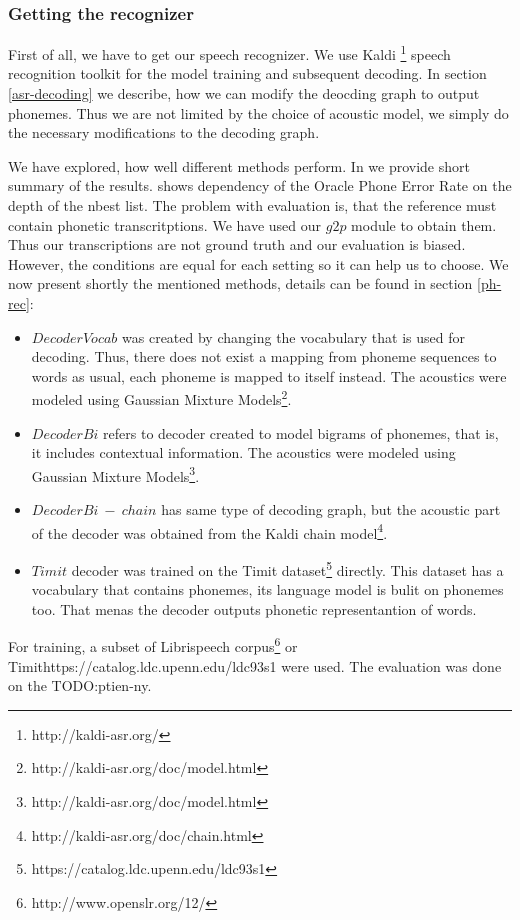 \subsubsection{Getting the recognizer}
First of all, we have to get our speech recognizer.
We use Kaldi \footnote{http://kaldi-asr.org/} speech recognition toolkit for the model training and subsequent decoding.
In section \ref{asr-decoding} we describe, how we can modify the deocding graph to output phonemes.
Thus we are not limited by the choice of acoustic model, we simply do the necessary modifications to the decoding graph.
\par
We have explored, how well different methods perform.
In  we provide short summary of the results.
 shows dependency of the Oracle Phone Error Rate on the depth of the nbest list.
The problem with evaluation is, that the reference must contain phonetic transcritptions.
We have used our $g2p$ module to obtain them.
Thus our transcriptions are not ground truth and our evaluation is biased.
However, the conditions are equal for each setting so it can help us to choose.
We now present shortly the mentioned methods, details can be found in section \ref{ph-rec}:
\begin{itemize}
\item $DecoderVocab$ was created by changing the vocabulary that is used for decoding. Thus, there does not exist a mapping from phoneme sequences to words as usual, each phoneme is mapped to itself instead. The acoustics were modeled using Gaussian Mixture Models\footnote{http://kaldi-asr.org/doc/model.html}.
\item $DecoderBi$ refers to decoder created to model bigrams of phonemes, that is, it includes contextual information. The acoustics were modeled using Gaussian Mixture Models\footnote{http://kaldi-asr.org/doc/model.html}.
\item $DecoderBi\:-\:chain$ has same type of decoding graph, but the acoustic part of the decoder was obtained from the Kaldi chain model\footnote{http://kaldi-asr.org/doc/chain.html}.
\item $Timit$ decoder was trained on the Timit dataset\footnote{https://catalog.ldc.upenn.edu/ldc93s1} directly. This dataset has a vocabulary that contains phonemes, its language model is bulit on phonemes too.
That menas the decoder outputs phonetic representantion of words.
\end{itemize}
For training, a subset of Librispeech corpus\footnote{http://www.openslr.org/12/} or Timit{https://catalog.ldc.upenn.edu/ldc93s1} were used. The evaluation was done on the TODO:ptien-ny.
